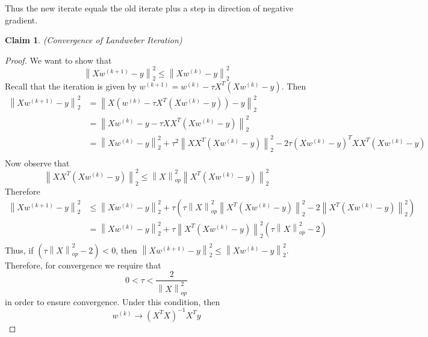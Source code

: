 \documentclass[12pt]{article}
\newtheorem{claim}{Claim}
\theoremstyle{definition}
\newcommand{\norm}[1]{\left\lVert#1\right\rVert}
\begin{document}
Thus the new iterate equals the old iterate plus a step in direction of negative gradient.

\begin{claim}(Convergence of Landweber Iteration)

\end{claim}
\begin{proof}
We want to show that
\begin{equation}
	\norm{Xw^{(k+1)} - y}^2_2 \leq \norm{Xw^{(k)} - y}^2_2
\end{equation}
Recall that the iteration is given by $w^{(k+1)} = w^{(k)} - \tau X^T(Xw^{(k)} - y)$. Then
\begin{align*}
	\norm{Xw^{(k+1)} - y}^2_2 &= \norm{X(w^{(k)} - \tau X^T(Xw^{(k)} - y)) - y}^2_2 \\
	&= \norm{Xw^{(k)} - y - \tau XX^T(Xw^{(k)} - y)}^2_2 \\
	&= \norm{Xw^{(k)} - y}^2_2 + \tau^2 \norm{XX^T(Xw^{(k)} - y)}^2_2 - 2\tau(Xw^{(k)} - y)^T X X^T (Xw^{(k)} - y) \\
\end{align*}
Now observe that
\begin{equation}
	\norm{XX^T(Xw^{(k)} - y)}^2_2 \leq \norm{X}^2_{op} \norm{X^T(Xw^{(k)} - y)}^2_2
\end{equation}
Therefore 
\begin{align*}
	\norm{Xw^{(k+1)} - y}^2_2 &\leq \norm{Xw^{(k)} - y}^2_2 + \tau\left(\tau \norm{X}^2_{op} \norm{X^T(Xw^{(k)} - y)}^2_2 - 2 \norm{X^T(Xw^{(k)} - y)}^2_2\right) \\
	&= \norm{Xw^{(k)} - y}^2_2 + \tau \norm{X^T(Xw^{(k)} - y)}^2_2(\tau \norm{X}^2_{op} - 2) \\
\end{align*}
Thus, if $(\tau \norm{X}^2_{op} - 2) < 0$, then $\norm{Xw^{(k+1)} - y}^2_2 \leq \norm{Xw^{(k)} - y}^2_2$. Therefore, for convergence we require that
\begin{equation}
	0 < \tau < \frac{2}{\norm{X}^2_{op}}
\end{equation}
in order to ensure convergence. Under this condition, then
\begin{equation}
	w^{(k)} \to (X^T X)^{-1}X^T y
\end{equation}
\end{proof}
\end{document}
